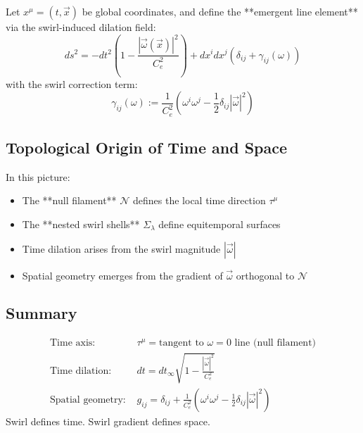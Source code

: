 Let \( x^\mu = (t, \vec{x}) \) be global coordinates, and define the **emergent line element** via the swirl-induced dilation field:
\[
    ds^2 = -dt^2 \left( 1 - \frac{|\vec{\omega}(\vec{x})|^2}{C_e^2} \right) + dx^i dx^j \left( \delta_{ij} + \gamma_{ij}(\omega) \right)
\]
with the swirl correction term:
\[
    \gamma_{ij}(\omega) := \frac{1}{C_e^2} \left( \omega^i \omega^j - \frac{1}{2} \delta_{ij} |\vec{\omega}|^2 \right)
\]

\subsection{Topological Origin of Time and Space}
\label{subsec:topological_emergence}

In this picture:
\begin{itemize}[leftmargin=1.5em]
    \item The **null filament** \( \mathcal{N} \) defines the local time direction \( \tau^\mu \)
    \item The **nested swirl shells** \( \Sigma_\lambda \) define equitemporal surfaces
    \item Time dilation arises from the swirl magnitude \( |\vec{\omega}| \)
    \item Spatial geometry emerges from the gradient of \( \vec{\omega} \) orthogonal to \( \mathcal{N} \)
\end{itemize}

\subsection*{Summary}

\begin{tcolorbox}[colback=purple!2, colframe=purple!60!black, title=Emergent Space-Time Structure]
    \begin{align*}
        \text{Time axis: } & \tau^\mu = \text{tangent to } \omega = 0 \text{ line (null filament)} \\
        \text{Time dilation: } & dt = dt_\infty \sqrt{1 - \frac{|\vec{\omega}|^2}{C_e^2}} \\
        \text{Spatial geometry: } & g_{ij} = \delta_{ij} + \frac{1}{C_e^2} \left( \omega^i \omega^j - \frac{1}{2} \delta_{ij} |\vec{\omega}|^2 \right)
    \end{align*}
    Swirl defines time. Swirl gradient defines space.
\end{tcolorbox}